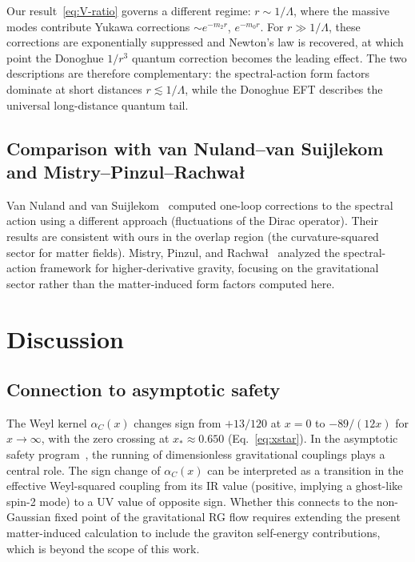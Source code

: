 \documentclass[aps,prd,twocolumn,superscriptaddress,nofootinbib,floatfix]{revtex4-2}
\theoremstyle{definition}
\theoremstyle{remark}
\begin{document}
Our result~\eqref{eq:V-ratio} governs a different regime:
$r \sim 1/\Lambda$, where the massive modes contribute Yukawa corrections
$\sim e^{-m_2 r}$, $e^{-m_0 r}$. For $r \gg 1/\Lambda$, these corrections
are exponentially suppressed and Newton's law is recovered, at which point
the Donoghue $1/r^3$ quantum correction becomes the leading effect. The two
descriptions are therefore complementary: the spectral-action form factors
dominate at short distances $r \lesssim 1/\Lambda$, while the Donoghue EFT
describes the universal long-distance quantum tail.

\subsection{Comparison with van Nuland--van Suijlekom and Mistry--Pinzul--Rachwa{\l}}

Van Nuland and van Suijlekom~\cite{vanNuland:2022xkm} computed one-loop
corrections to the spectral action using a different approach (fluctuations of
the Dirac operator). Their results are consistent with ours in the overlap
region (the curvature-squared sector for matter fields). Mistry, Pinzul, and
Rachwa{\l}~\cite{Mistry:2020xqh} analyzed the spectral-action framework for
higher-derivative gravity, focusing on the gravitational sector rather than the
matter-induced form factors computed here.


\section{Discussion}
\label{sec:discussion}

\subsection{Connection to asymptotic safety}

The Weyl kernel $\alpha_C(x)$ changes sign from $+13/120$ at $x = 0$ to
$-89/(12x)$ for $x \to \infty$, with the zero crossing at
$x_\ast \approx 0.650$ (Eq.~\eqref{eq:xstar}). In the asymptotic safety
program~\cite{Reuter:1996cp,Codello:2008vh,FradkinTseytlin:1982}, the running of dimensionless
gravitational couplings plays a central role. The sign change of $\alpha_C(x)$
can be interpreted as a transition in the effective Weyl-squared coupling from
its IR value (positive, implying a ghost-like spin-2 mode) to a UV value of
opposite sign. Whether this connects to the non-Gaussian fixed point of the
gravitational RG flow requires extending the present matter-induced calculation
to include the graviton self-energy contributions, which is beyond the scope
of this work.
\end{document}
